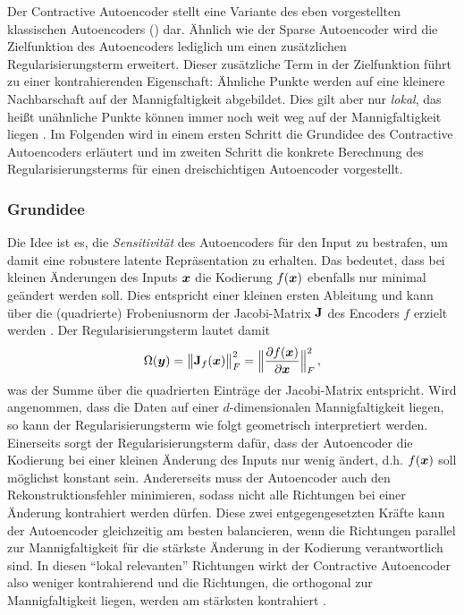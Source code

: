 Der Contractive Autoencoder \parencite{Rifai.2011a} stellt eine Variante des eben vorgestellten klassischen Autoencoders
() dar. Ähnlich wie der Sparse Autoencoder wird die
Zielfunktion des Autoencoders lediglich um einen zusätzlichen Regularisierungsterm erweitert.
Dieser zusätzliche Term in der Zielfunktion führt zu einer kontrahierenden Eigenschaft: Ähnliche
Punkte werden auf eine kleinere Nachbarschaft auf der Mannigfaltigkeit abgebildet. Dies gilt aber
nur \textit{lokal}, das heißt unähnliche Punkte können immer noch weit weg auf der Mannigfaltigkeit
liegen \parencite[521]{Goodfellow.2016}. Im Folgenden wird in einem ersten Schritt die Grundidee des
Contractive Autoencoders erläutert und im zweiten Schritt die konkrete Berechnung des
Regularisierungsterms für einen dreischichtigen Autoencoder vorgestellt.

\subsubsection{Grundidee}
\label{ch:MethodenDerDimRed:CAE:Grundidee}

Die Idee ist es, die \textit{Sensitivität} des Autoencoders für den Input zu bestrafen, um damit
eine robustere latente Repräsentation zu erhalten. Das bedeutet, dass bei kleinen Änderungen des
Inputs $\bm{x}$ die Kodierung $f(\bm{x})$ ebenfalls nur minimal geändert werden soll. Dies
entspricht einer kleinen ersten Ableitung und kann über die (quadrierte) Frobeniusnorm der
Jacobi-Matrix $\mathbf{J}$ des Encoders $f$ erzielt werden \parencites[2]{Rifai.2011a}[521]{Goodfellow.2016}. Der Regularisierungsterm lautet damit
\begin{equation}
	\label{eq:CAE-Regularisierung}
	\Omega(\vect{y}) = \norm[\big]{\mat{J}_f(\vect{x})}_F^2 =  \norm[\Big]{ \frac{\partial f(\vect{x})}{\partial \vect{x}} }^2_F \, ,
\end{equation}
was der Summe über die quadrierten Einträge der Jacobi-Matrix entspricht. Wird angenommen, dass die Daten auf einer $d$-dimensionalen Mannigfaltigkeit liegen, so kann der Regularisierungsterm wie folgt geometrisch interpretiert werden. Einerseits sorgt der Regularisierungsterm dafür, dass der Autoencoder die Kodierung bei einer kleinen Änderung des Inputs nur wenig ändert, d.h. $f(\bm{x})$ soll möglichst konstant sein. Andererseits muss der Autoencoder auch den Rekonstruktionsfehler minimieren, sodass nicht alle Richtungen bei einer Änderung kontrahiert werden dürfen. Diese zwei entgegengesetzten Kräfte kann der Autoencoder gleichzeitig am besten balancieren, wenn die Richtungen parallel zur Mannigfaltigkeit für die stärkste Änderung in der Kodierung verantwortlich sind. In diesen \enquote{lokal relevanten} Richtungen wirkt der Contractive Autoencoder also weniger kontrahierend und die Richtungen, die orthogonal zur Mannigfaltigkeit liegen, werden am stärksten kontrahiert \parencites[1]{Rifai.2011a}[649 -- 650]{Rifai.2011b}.

